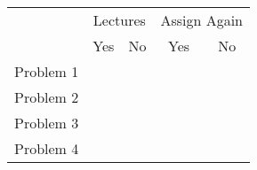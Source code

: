 \documentclass[11pt,letterpaper]{article}
\begin{document}
\vspace{0.25cm}
\begin{center}
\begin{tabular}{c||c|c|c|c|}
  & \multicolumn{2}{c|}{Lectures} &  \multicolumn{2}{c|}{Assign Again} \\ \cline{2-5}
   & Yes & No & Yes & No \\ \hline \hline
  Problem 1 &  &  &  &  \\ \hline 
  Problem 2 &  &  &  &  \\ \hline 
  Problem 3 &  &  &  &  \\ \hline 
  Problem 4 &  &  &  & 
\end{tabular}
\end{center}
\end{document}
